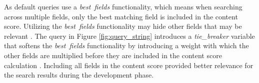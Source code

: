 As default queries use a \emph{best\ fields} functionality, which means when searching across multiple fields,
only the best matching field is included in the content score.
Utilizing the \emph{best\ fields} functionality may hide other fields that may be relevant
\cite{relevantSearch}.
The query in Figure \ref{fig:query_string} introduces a \emph{tie\_breaker} variable 
that softens the \emph{best\ fields} functionality by introducing a weight 
with which the other fields are multiplied before they are included in the content score calculation 
\cite{relevantSearch}.
Including all fields in the content score provided better relevance for the search results during the development phase.






